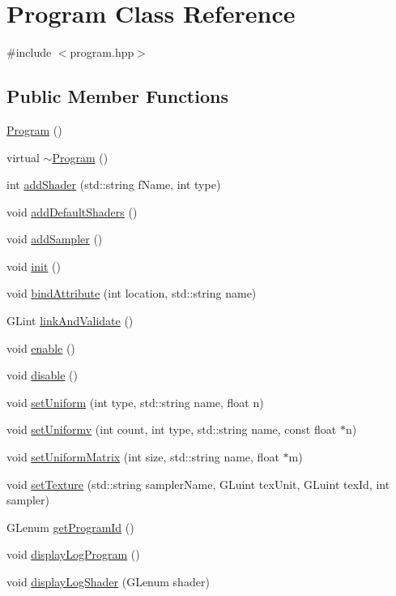 \hypertarget{classProgram}{\section{Program Class Reference}
\label{classProgram}
}


{\ttfamily \#include $<$program.\-hpp$>$}

\subsection*{Public Member Functions}
\begin{DoxyCompactItemize}
\item 
\hyperlink{classProgram_aaefaa0df08f3484476fc4d61e97acbdc}{Program} ()
\item 
virtual \hyperlink{classProgram_a986aef1c50e1d338a3315a47ba6df549}{$\sim$\-Program} ()
\item 
int \hyperlink{classProgram_ade6fdcdf18bad44d602588eb2870baba}{add\-Shader} (std\-::string f\-Name, int type)
\item 
void \hyperlink{classProgram_a93a1c92516c590a6779438568ef729a5}{add\-Default\-Shaders} ()
\item 
void \hyperlink{classProgram_aa0fe912ec4d03063c3e15b383ae8c113}{add\-Sampler} ()
\item 
void \hyperlink{classProgram_a33d5912b81ccf4a0c089894513844580}{init} ()
\item 
void \hyperlink{classProgram_a047506f09edeb4f862f58599b232fd79}{bind\-Attribute} (int location, std\-::string name)
\item 
G\-Lint \hyperlink{classProgram_a457e11c867d335cdd815a657fa87e9b1}{link\-And\-Validate} ()
\item 
void \hyperlink{classProgram_ae435cb6813edc4ce2a8f91c99fb7a79b}{enable} ()
\item 
void \hyperlink{classProgram_ab9749de7ec9108233c5f632d9afaa0e9}{disable} ()
\item 
void \hyperlink{classProgram_ac342b7cadffa671c9a0164997a0141fb}{set\-Uniform} (int type, std\-::string name, float n)
\item 
void \hyperlink{classProgram_ad09d665e9a38943e9087243aab3d7162}{set\-Uniformv} (int count, int type, std\-::string name, const float $\ast$n)
\item 
void \hyperlink{classProgram_a28a7ee31d22c01c65e559699ef07f8ec}{set\-Uniform\-Matrix} (int size, std\-::string name, float $\ast$m)
\item 
void \hyperlink{classProgram_a1d5b0c22dfb26649a5cca8c879eaecc5}{set\-Texture} (std\-::string sampler\-Name, G\-Luint tex\-Unit, G\-Luint tex\-Id, int sampler)
\item 
G\-Lenum \hyperlink{classProgram_a092f9c234261a3e0e05766b0bb92fcb8}{get\-Program\-Id} ()
\item 
void \hyperlink{classProgram_a76c829244760f9ddbee5da25b296dcb3}{display\-Log\-Program} ()
\item 
void \hyperlink{classProgram_a411a347acc65a576ab84bc464bd35b45}{display\-Log\-Shader} (G\-Lenum shader)
\end{DoxyCompactItemize}


